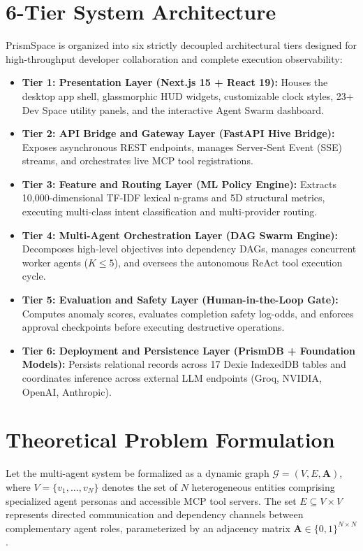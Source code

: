 \documentclass[12pt,a4paper]{report}
\begin{document}
\section{6-Tier System Architecture}
PrismSpace is organized into six strictly decoupled architectural tiers designed for high-throughput developer collaboration and complete execution observability:
\begin{itemize}\setlength{\itemsep}{1.5pt}\setlength{\parsep}{0pt}\setlength{\topsep}{2pt}
    \item \textbf{Tier 1: Presentation Layer (Next.js 15 + React 19):} Houses the desktop app shell, glassmorphic HUD widgets, customizable clock styles, 23+ Dev Space utility panels, and the interactive Agent Swarm dashboard.
    \item \textbf{Tier 2: API Bridge and Gateway Layer (FastAPI Hive Bridge):} Exposes asynchronous REST endpoints, manages Server-Sent Event (SSE) streams, and orchestrates live MCP tool registrations.
    \item \textbf{Tier 3: Feature and Routing Layer (ML Policy Engine):} Extracts 10,000-dimensional TF-IDF lexical n-grams and 5D structural metrics, executing multi-class intent classification and multi-provider routing.
    \item \textbf{Tier 4: Multi-Agent Orchestration Layer (DAG Swarm Engine):} Decomposes high-level objectives into dependency DAGs, manages concurrent worker agents ($K \le 5$), and oversees the autonomous ReAct tool execution cycle.
    \item \textbf{Tier 5: Evaluation and Safety Layer (Human-in-the-Loop Gate):} Computes anomaly scores, evaluates completion safety log-odds, and enforces approval checkpoints before executing destructive operations.
    \item \textbf{Tier 6: Deployment and Persistence Layer (PrismDB + Foundation Models):} Persists relational records across 17 Dexie IndexedDB tables and coordinates inference across external LLM endpoints (Groq, NVIDIA, OpenAI, Anthropic).
\end{itemize}

\section{Theoretical Problem Formulation}
Let the multi-agent system be formalized as a dynamic graph $\mathcal{G} = (V, E, \mathbf{A})$, where $V = \{v_1, \dots, v_N\}$ denotes the set of $N$ heterogeneous entities comprising specialized agent personas and accessible MCP tool servers. The set $E \subseteq V \times V$ represents directed communication and dependency channels between complementary agent roles, parameterized by an adjacency matrix $\mathbf{A} \in \{0, 1\}^{N \times N}$.
\end{document}
